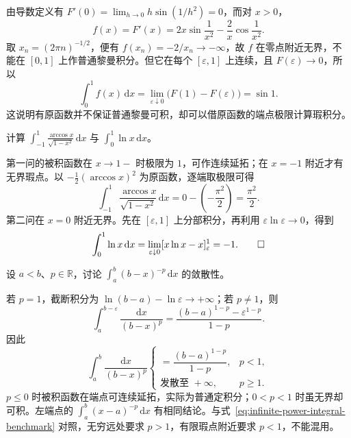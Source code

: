\begin{solve}
由导数定义有 $F'(0)=\lim_{h\to0}h\sin(1/h^2)=0$，而对 $x>0$，
\[
    f(x)=F'(x)=2x\sin\frac1{x^2}-\frac2x\cos\frac1{x^2}.
\]
取 $x_n=(2\pi n)^{-1/2}$，便有 $f(x_n)=-2/x_n\to-\infty$，故 $f$ 在零点附近无界，不能在 $[0,1]$ 上作普通黎曼积分。但它在每个 $[\varepsilon,1]$ 上连续，且 $F(\varepsilon)\to0$，所以
\[
    \int_0^1 f(x)\,\mathrm{d}x
    =\lim_{\varepsilon\downarrow0}
        \bigl(F(1)-F(\varepsilon)\bigr)=\sin1.
\]
这说明有原函数并不保证普通黎曼可积，却可以借原函数的端点极限计算瑕积分。
\end{solve}

\begin{example}
\label{ex:singular-arccosine-and-logarithm}
计算 $\int_{-1}^1\frac{\arccos x}{\sqrt{1-x^2}}\,\mathrm{d}x$ 与 $\int_0^1\ln x\,\mathrm{d}x$。
\end{example}

\begin{solve}
第一问的被积函数在 $x\to1-$ 时极限为 $1$，可作连续延拓；在 $x=-1$ 附近才有无界瑕点。以 $-\tfrac12(\arccos x)^2$ 为原函数，逐端取极限可得
\[
    \int_{-1}^1\frac{\arccos x}{\sqrt{1-x^2}}\,\mathrm{d}x
    =0-\left(-\frac{\pi^2}{2}\right)=\frac{\pi^2}{2}.
\]
第二问在 $x=0$ 附近无界。先在 $[\varepsilon,1]$ 上分部积分，再利用 $\varepsilon\ln\varepsilon\to0$，得到
\[
    \int_0^1\ln x\,\mathrm{d}x
    =\lim_{\varepsilon\downarrow0}
        [x\ln x-x]_\varepsilon^1=-1.
    \qedhere
\]
\end{solve}

\begin{example}
\label{ex:singular-power-integral-benchmark}
设 $a<b$、$p\in\mathbb{R}$，讨论 $\int_a^b(b-x)^{-p}\,\mathrm{d}x$ 的敛散性。
\end{example}

\begin{solve}
若 $p=1$，截断积分为 $\ln(b-a)-\ln\varepsilon\to+\infty$；若 $p\neq1$，则
\[
    \int_a^{b-\varepsilon}\frac{\mathrm{d}x}{(b-x)^p}
    =\frac{(b-a)^{1-p}-\varepsilon^{1-p}}{1-p}.
\]
因此
\begin{equation}
    \int_a^b\frac{\mathrm{d}x}{(b-x)^p}
    \begin{cases}
        =\dfrac{(b-a)^{1-p}}{1-p},&p<1,\\
        \text{发散至 }+\infty,&p\geq1.
    \end{cases}
    \label{eq:singular-power-integral-benchmark}
\end{equation}
$p\leq0$ 时被积函数在端点可连续延拓，实际为普通定积分；$0<p<1$ 时虽无界却可积。左端点的 $\int_a^b(x-a)^{-p}\,\mathrm{d}x$ 有相同结论。与式~\eqref{eq:infinite-power-integral-benchmark} 对照，无穷远处要求 $p>1$，有限瑕点附近要求 $p<1$，不能混用。
\end{solve}


